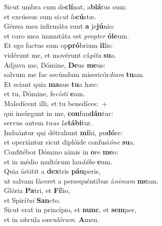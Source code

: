 \evenverse Sicut umbra cum de\textbf{clí}nat, a\textbf{blá}tus sum:~\*\\
\evenverse et excússus sum si\textit{cut} \textit{lo}\textbf{cú}stæ.\\
\oddverse Génua mea infirmáta sunt \textbf{a} je\textbf{jú}nio:~\*\\
\oddverse et caro mea immutáta est \textit{prop}\textit{ter} \textbf{ó}\textbf{le}um.\\
\evenverse Et ego factus sum op\textbf{pró}brium \textbf{il}lis:~\*\\
\evenverse vidérunt me, et movérunt cá\textit{pi}\textit{ta} \textbf{su}a.\\
\oddverse Adjuva me, Dómine, \textbf{De}us \textbf{me}us:~\*\\
\oddverse salvum me fac secúndum misericór\textit{di}\textit{am} \textbf{tu}am.\\
\evenverse Et sciant quia \textbf{ma}nus \textbf{tu}a hæc:~\*\\
\evenverse et tu, Dómine, fe\textit{cí}\textit{sti} \textbf{e}am.\\
\oddverse Maledícent illi, et tu benedíces:~+\\
\oddverse  qui insúrgunt in me, \textbf{con}fun\textbf{dán}tur:~\*\\
\oddverse servus autem tu\textit{us} \textit{læ}\textbf{tá}\textbf{bi}tur.\\
\evenverse Induántur qui détrahunt \textbf{mi}hi, pu\textbf{dó}re:~\*\\
\evenverse et operiántur sicut diplóide confusi\textit{ó}\textit{ne} \textbf{su}a.\\
\oddverse Confitébor Dómino nimis in \textbf{o}re \textbf{me}o:~\*\\
\oddverse et in médio multórum lau\textit{dá}\textit{bo} \textbf{e}um.\\
\evenverse Quia ástitit a \textbf{dex}tris \textbf{páu}peris,~\*\\
\evenverse ut salvam fáceret a persequéntibus á\textit{ni}\textit{mam} \textbf{me}am.\\
\oddverse Glória \textbf{Pa}tri, et \textbf{Fí}lio,~\*\\
\oddverse et Spirí\textit{tu}\textit{i} \textbf{San}cto.\\
\evenverse Sicut erat in princípio, et \textbf{nunc}, et \textbf{sem}per,~\*\\
\evenverse et in sǽcula sæcu\textit{ló}\textit{rum}. \textbf{A}men.\\
